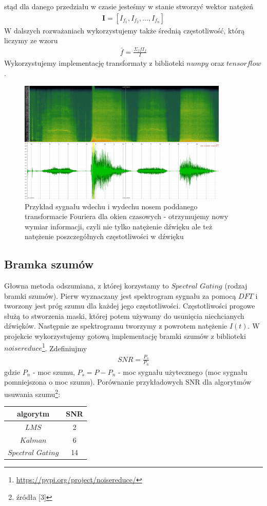 \documentclass[polish]{article}
\begin{document}
stąd dla danego przedziału w czasie jesteśmy w stanie stworzyć wektor natężeń
\begin{gather*}
	\boldsymbol{I} = [I_{f_1}, I_{f_2}, ..., I_{f_n}]
\end{gather*}
W dalszych rozważaniach wykorzystujemy także średnią częstotliwość, którą liczymy ze wzoru
\begin{gather*}
	\bar{f} = \frac{\Sigma_ffI_f}{I}
\end{gather*}
Wykorzystujemy implementację transformaty z biblioteki $numpy$ oraz $tensorflow$.
\begin{figure}[H]
	\centering
	\includegraphics[width=10cm]{stft2}
	\caption{Przykład sygnału wdechu i wydechu nosem poddanego transformacie Fouriera dla okien czasowych - otrzymujemy nowy wymiar informacji, czyli nie tylko natężenie
dźwięku ale też natężenie poszczegółnych częstotliwości w dźwięku}
\end{figure}

\subsection{Bramka szumów}
Głowna metoda odszumiana, z której korzystamy to $Spectral$ $Gating$ (rodzaj bramki szumów).  Pierw wyznaczany jest spektrogram sygnału za pomocą $DFT$ i 
tworzony jest próg szumu dla każdej jego częstotliwości.
Częstotliwości progowe służą to stworzenia maski, której potem używamy do usunięcia niechcianych dźwięków.
Następnie ze spektrogramu tworzymy z powrotem natężenie $I(t)$. W projekcie wykorzystujemy gotową implementację bramki szumów z biblioteki $noisereduce$\footnote{\url{https://pypi.org/project/noisereduce/}}. Zdefiniujmy
\begin{gather*}
	SNR = \frac{P_s}{P_n}
\end{gather*}
gdzie $P_n$ - moc szumu, $P_s = P - P_n$ - moc sygnału użytecznego (moc sygnału pomniejszona o moc szumu).
Porównanie przykładowych SNR dla algorytmów usuwania szumu\footnote{źródła [3]}:
\begin{center}
\begin{tabular}{c  | c }
algorytm & SNR \\
\hline
$LMS$ & 2 \\
$Kalman$ & 6 \\
$Spectral$ $Gating$ & 14
\end{tabular}
\end{center}
\end{document}
